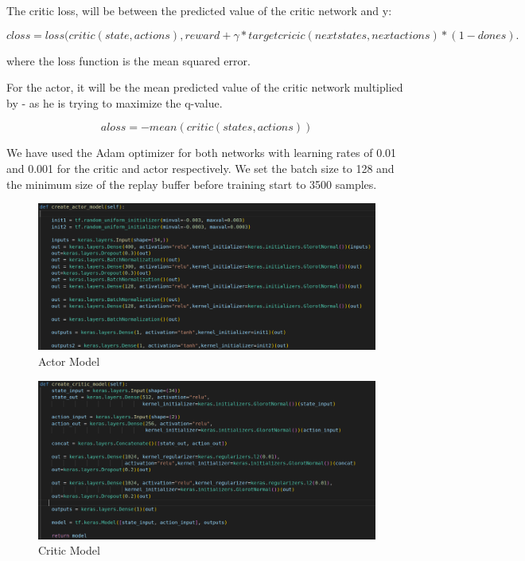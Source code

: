 \documentclass[12pt]{extarticle}
\begin{document}
The critic loss, will be between the predicted value of the critic network and y:

 

     \begin{equation} \label{critic_loss}
     closs= loss(critic(state,actions),reward+ \gamma*targetcricic(nextstates,nextactions)*(1-dones).
   \end{equation}
 
where the loss function is the mean squared error.

For the actor, it will be the mean predicted value of the critic network multiplied by - as  he is trying to maximize the q-value.

\begin{equation} \label{actor_loss}
     aloss= -mean(critic(states,actions))
   \end{equation}
   
We have used the Adam optimizer for both networks with learning rates of 0.01 and 0.001 for the critic and actor respectively. We set the batch size to 128 and the minimum size of the replay buffer before training start to 3500 samples.


 \begin{figure}[h]  
\centering
\includegraphics[scale=0.35]{actor_model}
\caption[Actor model]{Actor Model}
\end{figure}





 \begin{figure}[h]  
\centering
\includegraphics[scale=0.30]{critic_model}
\caption[Critic model]{Critic Model}
\end{figure}
\end{document}
